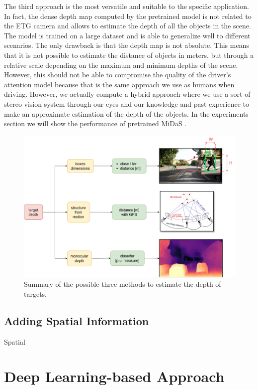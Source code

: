 The third approach is the most versatile and suitable to the specific application.
In fact, the dense depth map computed by the pretrained model is not related to the 
ETG camera and allows to estimate the depth of all the objects in the scene.
The model is trained on a large dataset and is able to generalize well to 
different scenarios. The only drawback is that the depth map is not absolute. 
This means that it is not possible to estimate the distance of objects in meters, 
but through a relative scale depending on the maximum and minimum depths of the 
scene. However, this should not be able to compromise the quality of the 
driver's attention model because that is the same approach we use as humans 
when driving. However, we actually compute a hybrid approach where we use a sort 
of stereo vision system through our eyes and our knowledge and past experience 
to make an approximate estimation of the depth of the objects.
In the experiments section we will show the performance of pretrained MiDaS 
\cite{midas}.

\begin{figure}
\centering
\includegraphics[width=\textwidth]{images/dreyeve/depth_estimation.png}
\caption{Summary of the possible three methods to estimate the depth of targets.}
\label{fig:depth_estimation}
\end{figure}



\subsection{Adding Spatial Information}
Spatial


\section{Deep Learning-based Approach}

